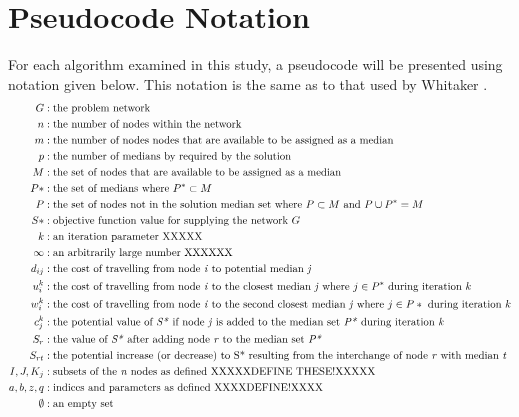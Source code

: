 \documentclass[11pt]{article}
\begin{document}
	\section{Pseudocode Notation}
	For each algorithm examined in this study, a pseudocode will be presented using notation given below.  This notation is the same as to that used by Whitaker  \cite{WHIT83}.
	\begin{align*}
	G &: \text{the problem network}\\
	n &: \text{the number of nodes within the network}\\
	m &: \text{the number of nodes nodes that are available to be assigned as a median}\\
	p &: \text{the number of medians by required by the solution}\\
	M &: \text{the set of nodes that are available to be assigned as a median}\\
	P* &: \text{the set of medians where } P^{*} \subset M\\
	P &: \text{the set of nodes not in the solution median set where } P \subset M \text{ and } P \cup P^{*} = M\\
	S* &: \text{objective function value for supplying the network } G\\
	k &: \text{an iteration parameter XXXXX}\\
	\infty &: \text{an arbitrarily large number XXXXXX}\\
	d_{ij} &: \text{the cost of travelling from node \emph{i} to potential median \emph{j}}\\
	u_{i}^{k} &: \text{the cost of travelling from node \emph{i} to the closest median \emph{j} where } j \in P^{*} \text{ during iteration } k\\
	w_{i}^{k} &: \text{the cost of travelling from node \emph{i} to the second closest median \emph{j} where } j \in P* \text{ during iteration } k\\
	c_{j}^{k} &: \text{the potential value of \emph{S*} if node \emph{j} is added to the median set \emph{P*} during iteration \emph{k}}\\
	S_{r} &: \text{the value of \emph{S*} after adding node \emph{r} to the median set \emph{P*}}\\
	S_{rt} &: \text{the potential increase (or decrease) to S* resulting from the interchange of node \emph{r} with median \emph{t}}\\
	I, J, K_{j} &: \text{subsets of the \emph{n} nodes as defined XXXXXDEFINE THESE!XXXXX}\\
	a, b, z, q &: \text{indices and parameters as defined XXXXDEFINE!XXXX}\\
	\emptyset &: \text{an empty set}	
	\end{align*}
	
\end{document}
